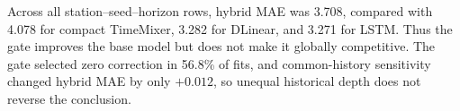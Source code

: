 Across all station--seed--horizon rows, hybrid MAE was 3.708, compared with 4.078 for compact TimeMixer, 3.282 for DLinear, and 3.271 for LSTM. Thus the gate improves the base model but does not make it globally competitive. The gate selected zero correction in 56.8\% of fits, and common-history sensitivity changed hybrid MAE by only \( +0.012 \), so unequal historical depth does not reverse the conclusion.
